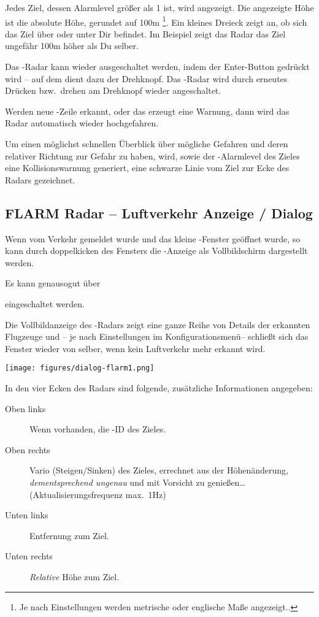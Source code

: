 Jedes Ziel, dessen Alarmlevel größer als 1 ist, wird angezeigt.
Die angezeigte Höhe ist die absolute Höhe, gerundet auf 100m
\footnote{Je nach Einstellungen werden metrische oder englische Maße angezeigt..}.
Ein kleines Dreieck zeigt an, ob sich das Ziel über oder unter Dir befindet.
Im Beispiel zeigt das Radar das Ziel ungefähr 100m höher als Du selber.


Das \fl-Radar kann wieder ausgeschaltet werden, indem der Enter-Button gedrückt
wird -- auf dem \al  dient dazu der Drehknopf. Das \fl-Radar wird durch erneutes
Drücken bzw.\ drehen am Drehknopf wieder angeschaltet.

Werden neue \fl-Zeile erkannt, oder das \fl erzeugt eine Warnung, dann wird das
Radar automatisch wieder hochgefahren.

Um einen möglichst schnellen Überblick über mögliche Gefahren und deren
relativer Richtung zur Gefahr zu haben, wird, sowie der \fl-Alarmlevel des Zieles
eine Kollisionswarnung generiert, eine schwarze Linie vom Ziel zur Ecke des
Radars gezeichnet.


\subsection*{FLARM Radar -- Luftverkehr Anzeige / Dialog}
Wenn vom \fl Verkehr gemeldet wurde und das kleine \fl-Fenster geöffnet wurde,  so
kann durch doppelkicken des Fensters die \fl-Anzeige als Vollbildschirm dargestellt werden.

Es kann genausogut über

\begin{quote}
\blink{}
\end{quote}

eingeschaltet werden.

Die Vollbildanzeige des \fl-Radars zeigt eine ganze Reihe von Details der erkannten Flugzeuge und -- je
nach Einstellungen im Konfigurationsmenü-- schließt sich das Fenster wieder von selber, wenn
kein Luftverkehr mehr erkannt wird.

\begin{center}
\texttt{[image: figures/dialog-flarm1.png]}
\end{center}

In den vier Ecken des Radars sind folgende, zusätzliche Informationen angegeben:
\begin{description}
\item[Oben links]  Wenn vorhanden, die \fl-ID des Zieles.
\item[Oben rechts] Vario (Steigen/Sinken) des Zieles, errechnet aus der Höhenänderung,
\textsl{dementsprechend ungenau} und mit Vorsicht zu genießen\dots (Aktualisierungsfrequenz max.\ 1Hz)
\item[Unten links]  Entfernung zum Ziel.
\item[Unten rechts]  \textsl{Relative} Höhe zum Ziel.
\end{description}
\vspace{1em}

